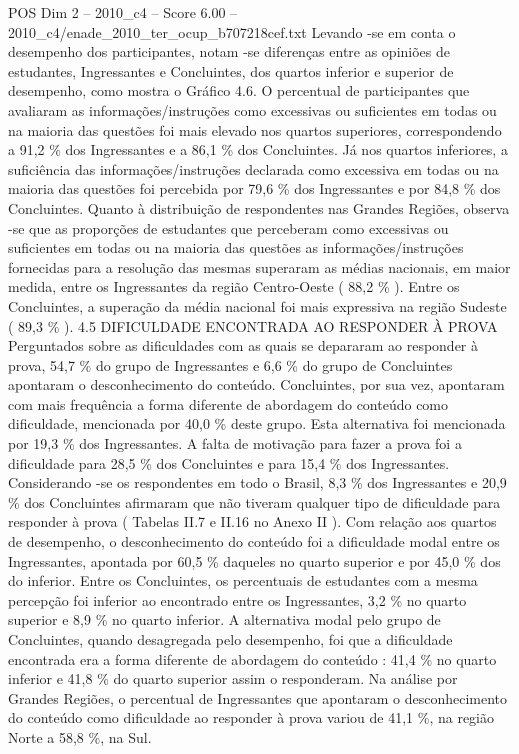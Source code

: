 \begin{textsample}{POS Dim 2 – 2010\_c4 – Score 6.00 – 2010\_c4/enade\_2010\_ter\_ocup\_b707218cef.txt}
Levando -se em conta o desempenho dos participantes, notam -se diferenças entre as opiniões de estudantes, Ingressantes e Concluintes, dos quartos inferior e superior de desempenho, como mostra o Gráfico 4.6.
O percentual de participantes que avaliaram as informações/instruções como excessivas ou suficientes em todas ou na maioria das questões foi mais elevado nos quartos superiores, correspondendo a 91,2 \% dos Ingressantes e a 86,1 \% dos Concluintes.
Já nos quartos inferiores, a suficiência das informações/instruções declarada como excessiva em todas ou na maioria das questões foi percebida por 79,6 \% dos Ingressantes e por 84,8 \% dos Concluintes.
Quanto à distribuição de respondentes nas Grandes Regiões, observa -se que as proporções de estudantes que perceberam como excessivas ou suficientes em todas ou na maioria das questões as informações/instruções fornecidas para a resolução das mesmas superaram as médias nacionais, em maior medida, entre os Ingressantes da região Centro-Oeste ( 88,2 \% ).
Entre os Concluintes, a superação da média nacional foi mais expressiva na região Sudeste ( 89,3 \% ). 4.5 DIFICULDADE ENCONTRADA AO RESPONDER À PROVA Perguntados sobre as dificuldades com as quais se depararam ao responder à prova, 54,7 \% do grupo de Ingressantes e 6,6 \% do grupo de Concluintes apontaram o desconhecimento do conteúdo.
Concluintes, por sua vez, apontaram com mais frequência a forma diferente de abordagem do conteúdo como dificuldade, mencionada por 40,0 \% deste grupo.
Esta alternativa foi mencionada por 19,3 \% dos Ingressantes.
A falta de motivação para fazer a prova foi a dificuldade para 28,5 \% dos Concluintes e para 15,4 \% dos Ingressantes.
Considerando -se os respondentes em todo o Brasil, 8,3 \% dos Ingressantes e 20,9 \% dos Concluintes afirmaram que não tiveram qualquer tipo de dificuldade para responder à prova ( Tabelas II.7 e II.16 no Anexo II ).
Com relação aos quartos de desempenho, o desconhecimento do conteúdo foi a dificuldade modal entre os Ingressantes, apontada por 60,5 \% daqueles no quarto superior e por 45,0 \% dos do inferior.
Entre os Concluintes, os percentuais de estudantes com a mesma percepção foi inferior ao encontrado entre os Ingressantes, 3,2 \% no quarto superior e 8,9 \% no quarto inferior.
A alternativa modal pelo grupo de Concluintes, quando desagregada pelo desempenho, foi que a dificuldade encontrada era a forma diferente de abordagem do conteúdo : 41,4 \% no quarto inferior e 41,8 \% do quarto superior assim o responderam.
Na análise por Grandes Regiões, o percentual de Ingressantes que apontaram o desconhecimento do conteúdo como dificuldade ao responder à prova variou de 41,1 \%, na região Norte a 58,8 \%, na Sul.

\end{textsample}
